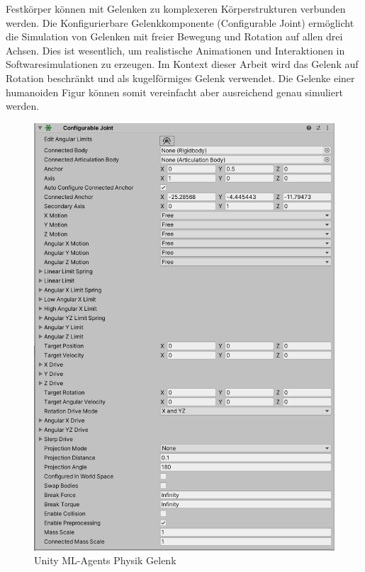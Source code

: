 Festkörper können mit Gelenken zu komplexeren Körperstrukturen verbunden werden. Die Konfigurierbare Gelenkkomponente (Configurable Joint) ermöglicht die Simulation von Gelenken mit freier Bewegung und Rotation auf allen drei Achsen. Dies ist wesentlich, um realistische Animationen und Interaktionen in Softwaresimulationen zu erzeugen. Im Kontext dieser Arbeit wird das Gelenk auf Rotation beschränkt und als kugelförmiges Gelenk verwendet. Die Gelenke einer humanoiden Figur können somit vereinfacht aber ausreichend genau simuliert werden.

\begin{figure}[H]
  \centering
  \includegraphics[scale=0.5]{img/komponente_configurable_joint.png}
  \caption{Unity ML-Agents Physik Gelenk}
  \label{fig:komponente_configurable_joint}
\end{figure}
